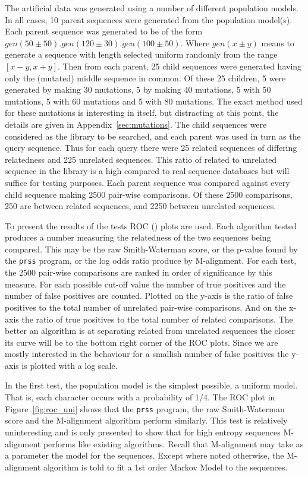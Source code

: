 \documentclass[letterpaper,11pt,oneside]{article}
\begin{document}
The artificial data was generated using a number of different population
models.  In all cases, 10 parent sequences were generated from the population
model(s).  Each parent sequence was generated to be of the form $gen(50\pm50)
. gen(120\pm30) . gen(100\pm50)$.  Where $gen(x\pm y)$ means to generate a
sequence with length selected uniform randomly from the range $[x-y, x+y]$.
Then from each parent, 25 child sequences were generated having only the
(mutated) middle sequence in common.  Of these 25 children, 5 were generated
by making 30 mutations, 5 by making 40 mutations, 5 with 50 mutations, 5 with
60 mutations and 5 with 80 mutations.  The exact method used for these
mutations is interesting in itself, but distracting at this point, the details
are given in Appendix~\ref{sec:mutations}.  The child sequences were
considered as the library to be searched, and each parent was used in turn as
the query sequence.  Thus for each query there were 25 related sequences of
differing relatedness and 225 unrelated sequences.  This ratio of related to
unrelated sequence in the library is a high compared to real sequence
databases but will suffice for testing purposes.  Each parent sequence was
compared against every child sequence making 2500 pair-wise comparisons.  Of
these 2500 comparisons, 250 are between related sequences, and 2250 between
unrelated sequences.

To present the results of the tests ROC (\cite{gribskov96, brenner98}) plots
are used.  Each algorithm tested produces a number measuring the relatedness
of the two sequences being compared.  This may be the raw Smith-Waterman
score, or the p-value found by the \verb!prss! program, or the log odds ratio
produce by M-alignment.  For each test, the 2500 pair-wise comparisons are
ranked in order of significance by this measure.  For each possible cut-off
value the number of true positives and the number of false positives are
counted.  Plotted on the y-axis is the ratio of false positives to the total
number of unrelated pair-wise comparisons.  And on the x-axis the ratio of true
positives to the total number of related comparisons.  The better an algorithm
is at separating related from unrelated sequences the closer its curve will be
to the bottom right corner of the ROC plots.  Since we are mostly interested
in the behaviour for a smallish number of false positives the y-axis is
plotted with a log scale.

In the first test, the population model is the simplest possible, a uniform
model.  That is, each character occurs with a probability of 1/4.  The ROC
plot in Figure~\ref{fig:roc_uni} shows that the \verb!prss! program, the raw
Smith-Waterman score and the M-alignment algorithm perform similarly.  This
test is relatively uninteresting and is only presented to show that for high
entropy sequences M-alignment performs like existing algorithms.  Recall that
M-alignment may take as a parameter the model for the sequences.  Except where
noted otherwise, the M-alignment algorithm is told to fit a 1st order Markov
Model to the sequences.
\end{document}
